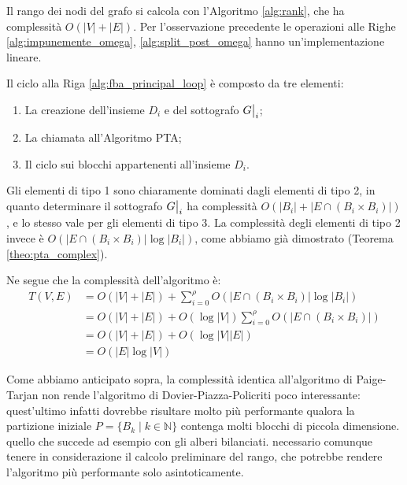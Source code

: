 \begin{proof2}
    Il rango dei nodi del grafo si calcola con l'Algoritmo \ref{alg:rank}, che ha complessità $O(|V|+|E|)$. Per l'osservazione precedente le operazioni alle Righe \ref{alg:impunemente_omega}, \ref{alg:split_post_omega} hanno un'implementazione lineare.

    Il ciclo alla Riga \ref{alg:fba_principal_loop} è composto da tre elementi:
    \begin{enumerate}
        \item La creazione dell'insieme $D_i$ e del sottografo $\restr{G}{i}$;
        \item La chiamata all'Algoritmo PTA;
        \item Il ciclo sui blocchi appartenenti all'insieme $D_i$.
    \end{enumerate}
    Gli elementi di tipo 1 sono chiaramente dominati dagli elementi di tipo 2, in quanto determinare il sottografo $\restr{G}{i}$ ha complessità $O(|B_i| + |E \cap (B_i \times B_i)|)$, e lo stesso vale per gli elementi di tipo 3. La complessità degli elementi di tipo 2 invece è $O(|E \cap (B_i \times B_i)| \log |B_i|)$, come abbiamo già dimostrato (Teorema \ref{theo:pta_complex}).

    Ne segue che la complessità dell'algoritmo è:
    \begin{align*}
        T(V,E) &= O(|V| + |E|) + \sum_{i=0}^\rho O(|E \cap (B_i \times B_i)| \log |B_i|)\\
        &= O(|V| + |E|) +  O(\log |V|) \sum_{i=0}^\rho O(|E \cap (B_i \times B_i)|)\\
        &= O(|V| + |E|) +  O(\log |V| |E|)\\
        &= O(|E| \log |V|)
    \end{align*}
\end{proof2}

Come abbiamo anticipato sopra, la complessità identica all'algoritmo di Paige-Tarjan non rende l'algoritmo di Dovier-Piazza-Policriti poco interessante: quest'ultimo infatti dovrebbe risultare molto più performante qualora la partizione iniziale $P = \{B_k \mid k \in \mathbb{N}\}$ contenga molti blocchi di piccola dimensione. \accente quello che succede ad esempio con gli alberi bilanciati. \accente necessario comunque tenere in considerazione il calcolo preliminare del rango, che potrebbe rendere l'algoritmo più performante solo asintoticamente.
